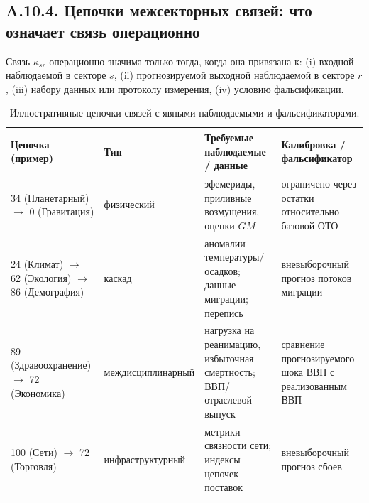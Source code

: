 \documentclass[11pt,a4paper]{article}
\begin{document}
	\subsection*{A.10.4. Цепочки межсекторных связей: что означает связь операционно}
	
	Связь $\kappa_{sr}$ операционно значима только тогда, когда она привязана к:
	(i) входной наблюдаемой в секторе $s$,
	(ii) прогнозируемой выходной наблюдаемой в секторе $r$,
	(iii) набору данных или протоколу измерения,
	(iv) условию фальсификации.
	
	\begin{table}[htbp]
		\centering
		\small
		\begin{tabular}{p{}p{}p{}p{}}
			\toprule
			\textbf{Цепочка (пример)} & \textbf{Тип} & \textbf{Требуемые наблюдаемые / данные} & \textbf{Калибровка / фальсификатор} \\
			\midrule
			34 (Планетарный) $\to$ 0 (Гравитация) & физический & эфемериды, приливные возмущения, оценки $GM$ & ограничено через остатки относительно базовой ОТО \\
			\midrule
			24 (Климат) $\to$ 62 (Экология) $\to$ 86 (Демография) & каскад & аномалии температуры/осадков; данные миграции; перепись & вневыборочный прогноз потоков миграции \\
			\midrule
			89 (Здравоохранение) $\to$ 72 (Экономика) & междисциплинарный & нагрузка на реанимацию, избыточная смертность; ВВП/отраслевой выпуск & сравнение прогнозируемого шока ВВП с реализованным ВВП \\
			\midrule
			100 (Сети) $\to$ 72 (Торговля) & инфраструктурный & метрики связности сети; индексы цепочек поставок & вневыборочный прогноз сбоев \\
			\bottomrule
		\end{tabular}
		\caption{Иллюстративные цепочки связей с явными наблюдаемыми и фальсификаторами.}
		\label{tab:link-chains-auditable}
	\end{table}
	
\end{document}

